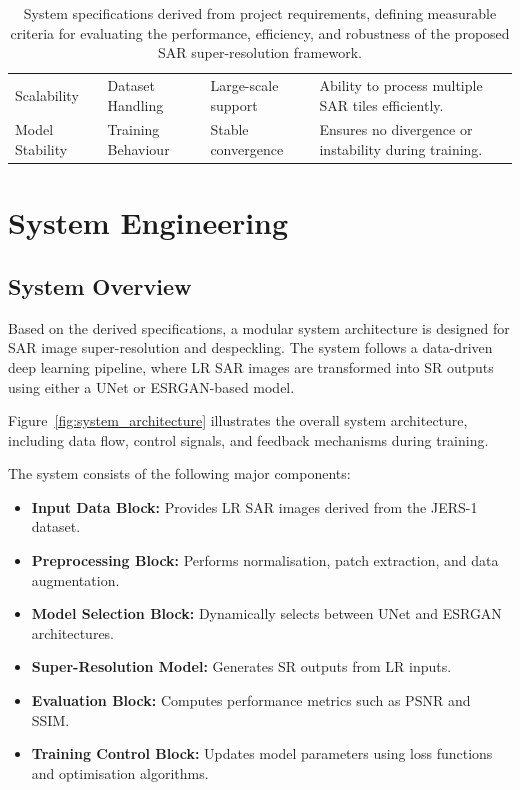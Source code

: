 \documentclass[conference]{IEEEtran}
\begin{document}
\begin{table}[ht!]
\begin{tabularx}{\textwidth}{p{3cm}XXX}
    Scalability & Dataset Handling & Large-scale support & Ability to process multiple SAR tiles efficiently. \\
    
    Model Stability & Training Behaviour & Stable convergence & Ensures no divergence or instability during training. \\
    
    \bottomrule
    \end{tabularx}
    \caption{System specifications derived from project requirements, defining measurable criteria for evaluating the performance, efficiency, and robustness of the proposed SAR super-resolution framework.}\label{tab:system-specifications}
\end{table}

\section{System Engineering}
\subsection{System Overview}

Based on the derived specifications, a modular system architecture is designed for SAR image super-resolution and despeckling. The system follows a data-driven deep learning pipeline, where LR SAR images are transformed into SR outputs using either a UNet or ESRGAN-based model.

Figure~\ref{fig:system_architecture} illustrates the overall system architecture, including data flow, control signals, and feedback mechanisms during training.

The system consists of the following major components:

\begin{itemize}
    \item \textbf{Input Data Block:} Provides LR SAR images derived from the JERS-1 dataset.
    \item \textbf{Preprocessing Block:} Performs normalisation, patch extraction, and data augmentation.
    \item \textbf{Model Selection Block:} Dynamically selects between UNet and ESRGAN architectures.
    \item \textbf{Super-Resolution Model:} Generates SR outputs from LR inputs.
    \item \textbf{Evaluation Block:} Computes performance metrics such as PSNR and SSIM.
    \item \textbf{Training Control Block:} Updates model parameters using loss functions and optimisation algorithms.
\end{itemize}
\end{document}
